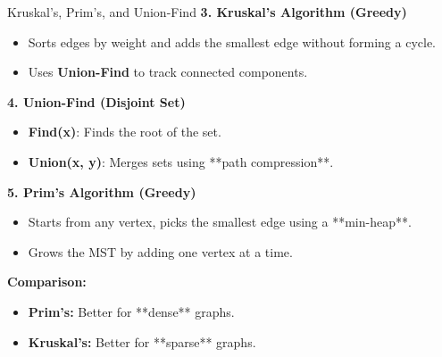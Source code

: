 \begin{frame}{Kruskal’s, Prim’s, and Union-Find}
    \textbf{3. Kruskal’s Algorithm (Greedy)}
    \begin{itemize}
        \item Sorts edges by weight and adds the smallest edge without forming a cycle.
        \item Uses \textbf{Union-Find} to track connected components.
    \end{itemize}

    \textbf{4. Union-Find (Disjoint Set)}
    \begin{itemize}
        \item \textbf{Find(x)}: Finds the root of the set.
        \item \textbf{Union(x, y)}: Merges sets using **path compression**.
    \end{itemize}

    \textbf{5. Prim’s Algorithm (Greedy)}
    \begin{itemize}
        \item Starts from any vertex, picks the smallest edge using a **min-heap**.
        \item Grows the MST by adding one vertex at a time.
    \end{itemize}

    \textbf{Comparison:}
    \begin{itemize}
        \item \textbf{Prim’s:} Better for **dense** graphs.
        \item \textbf{Kruskal’s:} Better for **sparse** graphs.
    \end{itemize}
\end{frame}






